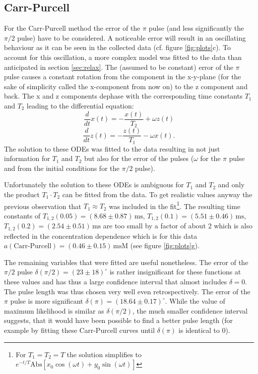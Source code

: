 \documentclass[a4paper]{scrartcl}
\numberwithin{equation}{section}
\numberwithin{figure}{section}
\numberwithin{table}{section}
\newcommand{\eq}[2]{\begin{equation}#1\label{#2}\end{equation}}
\begin{document}
\subsection{Carr-Purcell}
For the Carr-Purcell method the error of the $\pi$ pulse (and less significantly the $\pi/2$ pulse) have to be considered. A noticeable error will result in an oscillating behaviour as it can be seen in the collected data (cf. figure \ref{fig:plots}c). To account for this oscillation, a more complex model was fitted to the data than anticipated in section \ref{sec:relax}. The (assumed to be constant) error of the $\pi$ pulse causes a constant rotation from the component in the x-y-plane (for the sake of simplicity called the x-component from now on) to the z component and back. The x and z components dephase with the corresponding time constants $T_1$ and $T_2$ leading to the differential equation:
\eq{\frac{d}{dt}x(t) = -\frac{x(t)}{T_2} + \omega z(t)}{}
\eq{\frac{d}{dt}z(t) = -\frac{z(t)}{T_1} - \omega x(t) .}{}
The solution to these ODEs was fitted to the data resulting in not just information for $T_1$ and $T_2$ but also for the error of the pulses ($\omega$ for the $\pi$ pulse and from the initial conditions for the $\pi/2$ pulse).

Unfortunately the solution to these ODEs is ambiguous for $T_1$ and $T_2$ and only the product $T_1 \cdot T_2$ can be fitted from the data. To get realistic values anyway the previous observation that $T_1 \approx T_2$ was included in the fit\footnote{For $T_1=T_2=T$ the solution simplifies to $e^{-t/T} \text{Abs}[x_0 \cos(\omega t)+y_0 \sin(\omega t)]$}. The resulting time constants of $T_{1,2}(0.05)=(8.68\pm0.87)\,\text{ms}$, $T_{1,2}(0.1)=(5.51\pm 0.46)\,\text{ms}$, $T_{1,2}(0.2)=(2.54\pm 0.51)\,\text{ms}$ are too small by a factor of about 2 which is also reflected in the concentration dependence which is for this data $a(\text{Carr-Purcell})=(0.46\pm 0.15)\,\text{msM}$ (see figure \ref{fig:plots}g).%

The remaining variables that were fitted are useful nonetheless. The error of the $\pi/2$ pulse $\delta(\pi/2) = (23 \pm 18)^\circ$ is rather insignificant for these functions at these values and has thus a large confidence interval that almost includes $\delta = 0$. The pulse length was thus chosen very well even retrospectively. The error of the $\pi$ pulse is more significant $\delta(\pi)=(18.64\pm 0.17)^\circ$. While the value of maximum likelihood is similar as $\delta(\pi/2)$, the much smaller confidence interval suggests, that it would have been possible to find a better pulse length (for example by fitting these Carr-Purcell curves until $\delta(\pi)$ is identical to 0). 
\end{document}
